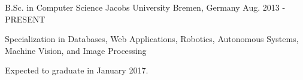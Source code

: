

\begin{cventries}

  \cventry
    {B.Sc. in Computer Science} %
    {Jacobs University} %
    {Bremen, Germany} %
    {Aug. 2013 - PRESENT} %
    {
      \begin{cvitems} %
        \item {Specialization in Databases, Web Applications, Robotics, Autonomous Systems, Machine Vision, and Image Processing}
        \item {Expected to graduate in January 2017.}
      \end{cvitems}
    }

\end{cventries}

